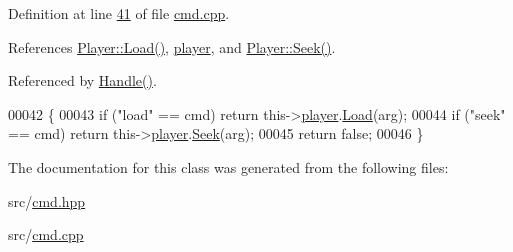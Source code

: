 Definition at line \hyperlink{cmd_8cpp_source_l00041}{41} of file \hyperlink{cmd_8cpp_source}{cmd.\+cpp}.



References \hyperlink{player_8cpp_source_l00089}{Player\+::\+Load()}, \hyperlink{cmd_8hpp_source_l00048}{player}, and \hyperlink{player_8cpp_source_l00134}{Player\+::\+Seek()}.



Referenced by \hyperlink{cmd_8cpp_source_l00022}{Handle()}.


\begin{DoxyCode}
00042 \{
00043     \textcolor{keywordflow}{if} (\textcolor{stringliteral}{"load"} == cmd) \textcolor{keywordflow}{return} this->\hyperlink{classCommandHandler_a398ba97a0625f5fbc3ced6679cfd3766}{player}.\hyperlink{classPlayer_a41c5eccb1f3b86383eaafe56a40a60e0}{Load}(arg);
00044     \textcolor{keywordflow}{if} (\textcolor{stringliteral}{"seek"} == cmd) \textcolor{keywordflow}{return} this->\hyperlink{classCommandHandler_a398ba97a0625f5fbc3ced6679cfd3766}{player}.\hyperlink{classPlayer_a873c7e0a5be71efbadeebfbc20d7448a}{Seek}(arg);
00045     \textcolor{keywordflow}{return} \textcolor{keyword}{false};
00046 \}
\end{DoxyCode}


The documentation for this class was generated from the following files\+:\begin{DoxyCompactItemize}
\item 
src/\hyperlink{cmd_8hpp}{cmd.\+hpp}\item 
src/\hyperlink{cmd_8cpp}{cmd.\+cpp}\end{DoxyCompactItemize}
